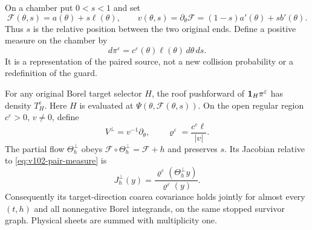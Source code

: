 On a chamber put $0<s<1$ and set
\begin{equation}\label{eq:v102-barycentric}
 \mathscr F(\theta,s)=a(\theta)+s\ell(\theta),\qquad
 v(\theta,s)=\partial_\theta\mathscr F
                       =(1-s)a'(\theta)+s b'(\theta).
\end{equation}
Thus $s$ is the relative position between the two original ends.
Define a positive measure on the chamber by
\begin{equation}\label{eq:v102-pair-measure}
 d\pi^\varepsilon=c^\varepsilon(\theta)\ell(\theta)
                                                    \,d\theta\,ds.
\end{equation}
It is a representation of the paired source, not a new collision
probability or a redefinition of the guard.

\begin{theorem}
\label{thm:v102-pair-coarea}
For any original Borel target selector $H$, the roof pushforward of
$\mathbf1_H\pi^\varepsilon$ has density $T_H^\varepsilon$. Here $H$
is evaluated at $\Psi(\theta,\mathscr F(\theta,s))$.
On the open regular region $c^\varepsilon>0$, $v\ne0$, define
\begin{equation}\label{eq:v102-transverse-field}
 V^\perp=v^{-1}\partial_\theta,\qquad
 \varrho^\varepsilon=\frac{c^\varepsilon\ell}{|v|}.
\end{equation}
The partial flow $\Theta_h^\perp$ obeys
$\mathscr F\circ\Theta_h^\perp=\mathscr F+h$ and preserves $s$.
Its Jacobian relative to \eqref{eq:v102-pair-measure} is
\begin{equation}\label{eq:v102-transverse-jacobian}
 J_h^\perp(y)=
 \frac{\varrho^\varepsilon(\Theta_h^\perp y)}
      {\varrho^\varepsilon(y)}.
\end{equation}
Consequently its target-direction coarea covariance holds jointly
for almost every $(t,h)$ and all nonnegative Borel integrands, on
the same stopped survivor graph. Physical sheets are summed with
multiplicity one.
\end{theorem}
